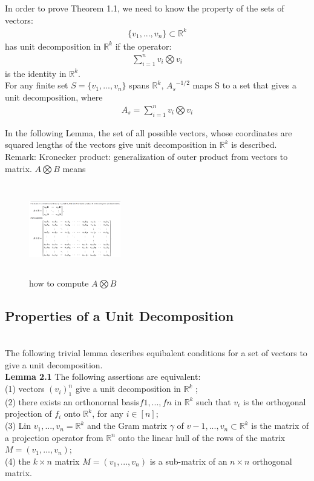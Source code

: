\documentclass[fontsize=12pt,a4paper]{article}
\begin{document}
In order to prove Theorem 1.1, we need to know the property of the sets of vectors:\\

\begin{align}
    \{v_1,...,v_n\} \subset \mathbb{R}^k
\end{align}
has unit decomposition in $\mathbb{R}^k$ if the operator:
\begin{align}
    \sum_{i=1}^n v_i \bigotimes v_i
\end{align}
is the identity in $\mathbb{R}^k$.\\
For any finite set $S = \{v_1,...,v_n\}$ spans $\mathbb{R}^k$, ${A_s}^{-1/2}$ maps S to a set that gives a unit decomposition, where
\begin{align}
    A_s = \sum_{i=1}^n v_i \bigotimes v_i
\end{align}

In the following Lemma, the set of all possible vectors, whose coordinates are squared lengths of the vectors give unit decomposition in $\mathbb{R}^k$ is described.\\

Remark: Kronecker product: generalization of outer product from vectors to matrix. $A\bigotimes B$ means

\begin{figure}[!htb]
\centering
  \includegraphics[width=4cm,height = 4cm]{Kronecker_product.png}
  \caption{how to compute $A\bigotimes B$}
\end{figure}

\subsection{Properties of a Unit Decomposition}\\
The following trivial lemma describes equibalent conditions for a set of vectors to give a unit decomposition.\\

\textbf{Lemma 2.1} The following assertions are equivalent:\\
(1) vectors $(v_i)^n_1$ give a unit decomposition in $\mathbb{R}^k$ ;\\
(2) there exists an orthonornal basis{$f1,...,fn$} in $\mathbb{R}^k$ such that $v_i$ is the orthogonal projection of $f_i$ onto $\mathbb{R}^k$, for any $i \in [n]$;\\
(3) Lin ${v_1,...,v_n} = \mathbb{R}^k$ and the Gram matrix $\gamma$ of ${v-1,...,v_n} \subset \mathbb{R}^k$ is the matrix of a projection operator from $\mathbb{R}^n$ onto the linear hull of the rows of the matrix $M = (v_1,...,v_n)$;\\
(4) the $k \times n$ matrix $M = (v_1,...,v_n)$ is a sub-matrix of an $n \times n$ orthogonal matrix.\\
\end{document}

